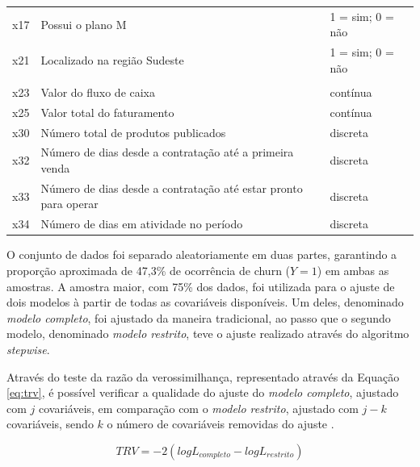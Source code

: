 \documentclass[twocolumn]{rbef}
\newcommand{\1}{\mathbbm{1}}
\begin{document}
\begin{table}
\begin{tabular}[t]{lll}
\hspace{1em}x17 & Possui o plano M & 1 = sim; 0 = não\\
\hspace{1em}x21 & Localizado na região Sudeste & 1 = sim; 0 = não\\
\addlinespace[0.3em]
\multicolumn{3}{l}{\textbf{Quantitativas}}\\
\hspace{1em}x23 & Valor do fluxo de caixa & contínua\\
\hspace{1em}x25 & Valor total do faturamento & contínua\\
\hspace{1em}x30 & Número total de produtos publicados & discreta\\
\hspace{1em}x32 & Número de dias desde a contratação até a primeira venda & discreta\\
\hspace{1em}x33 & Número de dias desde a contratação até estar pronto para operar & discreta\\
\hspace{1em}x34 & Número de dias em atividade no período & discreta\\
\bottomrule
\end{tabular}
\end{table}

O conjunto de dados foi separado aleatoriamente em duas partes, garantindo a proporção aproximada de 47,3\% de ocorrência de churn (\(Y=1\)) em ambas as amostras. A amostra maior, com 75\% dos dados, foi utilizada para o ajuste de dois modelos à partir de todas as covariáveis disponíveis. Um deles, denominado \textit{modelo completo}, foi ajustado da maneira tradicional, ao passo que o segundo modelo, denominado \textit{modelo restrito}, teve o ajuste realizado através do algoritmo \textit{stepwise}.

Através do teste da razão da verossimilhança, representado através da Equação \eqref{eq:trv}, é possível verificar a qualidade do ajuste do \textit{modelo completo}, ajustado com \(j\) covariáveis, em comparação com o \textit{modelo restrito}, ajustado com \(j-k\) covariáveis, sendo \(k\) o número de covariáveis removidas do ajuste \cite{Favero2017}.

\begin{equation}
TRV = -2(logL_{completo} - logL_{restrito})\label{eq:trv}
\end{equation}
\end{document}
